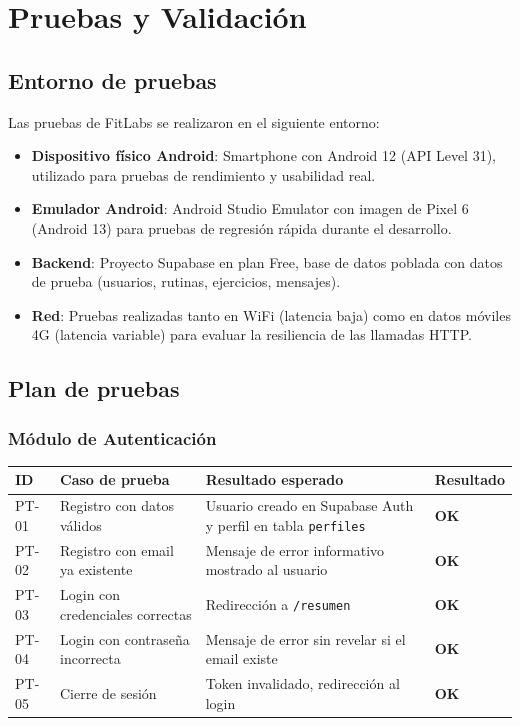\chapter{Pruebas y Validación}

\section{Entorno de pruebas}

Las pruebas de FitLabs se realizaron en el siguiente entorno:

\begin{itemize}
  \item \textbf{Dispositivo físico Android}: Smartphone con Android 12 (API Level 31), utilizado para pruebas de rendimiento y usabilidad real.
  \item \textbf{Emulador Android}: Android Studio Emulator con imagen de Pixel 6 (Android 13) para pruebas de regresión rápida durante el desarrollo.
  \item \textbf{Backend}: Proyecto Supabase en plan Free, base de datos poblada con datos de prueba (usuarios, rutinas, ejercicios, mensajes).
  \item \textbf{Red}: Pruebas realizadas tanto en WiFi (latencia baja) como en datos móviles 4G (latencia variable) para evaluar la resiliencia de las llamadas HTTP.
\end{itemize}

\section{Plan de pruebas}

\subsection{Módulo de Autenticación}

\begin{longtable}{@{}p{1cm}p{5cm}p{5cm}p{2.5cm}@{}}
\toprule
\textbf{ID} & \textbf{Caso de prueba} & \textbf{Resultado esperado} & \textbf{Resultado} \\
\midrule
\endhead
PT-01 & Registro con datos válidos & Usuario creado en Supabase Auth y perfil en tabla \texttt{perfiles} & \textcolor{green!60!black}{\textbf{OK}} \\
PT-02 & Registro con email ya existente & Mensaje de error informativo mostrado al usuario & \textcolor{green!60!black}{\textbf{OK}} \\
PT-03 & Login con credenciales correctas & Redirección a \texttt{/resumen} & \textcolor{green!60!black}{\textbf{OK}} \\
PT-04 & Login con contraseña incorrecta & Mensaje de error sin revelar si el email existe & \textcolor{green!60!black}{\textbf{OK}} \\
PT-05 & Cierre de sesión & Token invalidado, redirección al login & \textcolor{green!60!black}{\textbf{OK}} \\
\bottomrule
\end{longtable}


